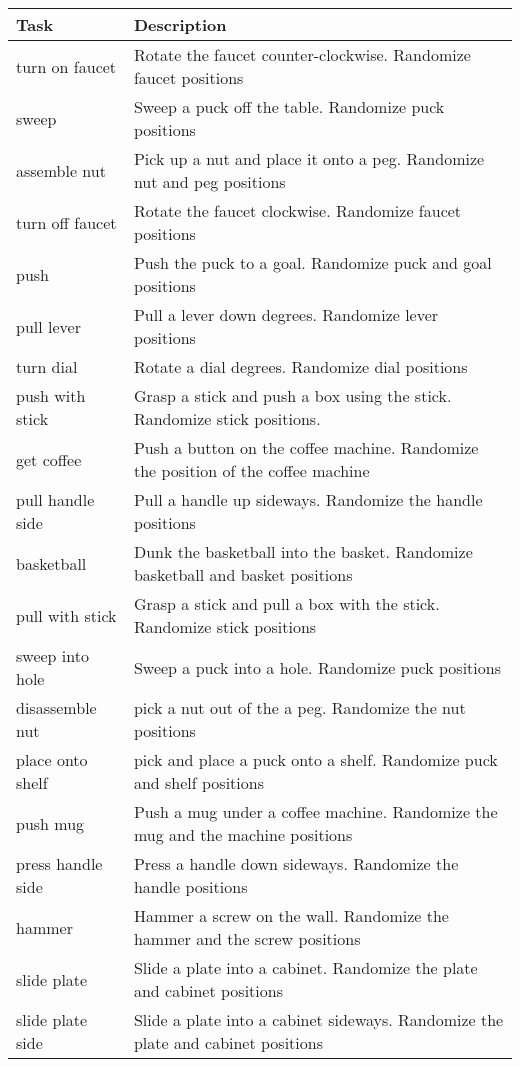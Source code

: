 \begin{table}[h]
\footnotesize
    \centering
    \begin{tabular}{ll}
\toprule
 Task & Description  \\
\midrule
turn on faucet & Rotate the faucet counter-clockwise. Randomize faucet positions \\
sweep & Sweep a puck off the table. Randomize puck positions\\
assemble nut & Pick up a nut and place it onto a peg. Randomize nut and peg positions\\
turn off faucet & Rotate the faucet clockwise. Randomize faucet positions\\
push & Push the puck to a goal. Randomize puck and goal positions\\
pull lever & Pull a lever down  degrees. Randomize lever positions\\
turn dial & Rotate a dial  degrees. Randomize dial positions\\
push with stick & Grasp a stick and push a box using the stick. Randomize stick positions.\\
get coffee & Push a button on the coffee machine. Randomize the position of the coffee machine\\
pull handle side & Pull a handle up sideways. Randomize the handle positions\\
basketball & Dunk the basketball into the basket. Randomize basketball and basket positions\\
pull with stick & Grasp a stick and pull a box with the stick. Randomize stick positions\\
sweep into hole & Sweep a puck into a hole. Randomize puck positions\\
disassemble nut & pick a nut out of the a peg. Randomize the nut positions\\
place onto shelf & pick and place a puck onto a shelf. Randomize puck and shelf positions\\
push mug & Push a mug under a coffee machine. Randomize the mug and the machine positions\\
press handle side & Press a handle down sideways. Randomize the handle positions\\
hammer & Hammer a screw on the wall. Randomize the hammer and the screw positions\\
slide plate & Slide a plate into a cabinet. Randomize the plate and cabinet positions\\
slide plate side & Slide a plate into a cabinet sideways. Randomize the plate and cabinet positions\\

\end{tabular}
\end{table}
